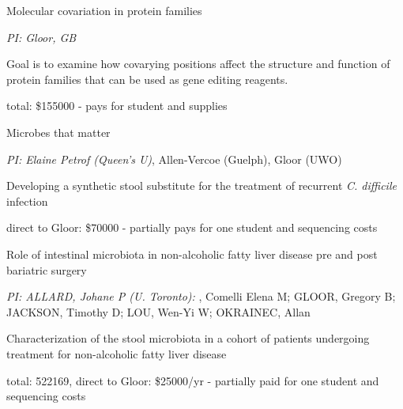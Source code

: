 \documentclass[11pt]{article}
\begin{document}
\begin{description}
\setlength\itemsep{0em}

\item[NSERC Discovery, 2015-2020:] Molecular covariation in protein families

\setlength\itemindent{-1em}

\item {\em PI: Gloor, GB}
\item Goal is to examine how  covarying positions affect the structure and function of protein families that can be used as gene editing reagents. 	
\item total: \$155000 - pays for student and supplies

\end{description}
\begin{description}
\setlength\itemsep{0em}

\item[NIH R21 Dec 2015-2017, NIH R33 2017-2018:] Microbes that matter

\setlength\itemindent{-1em}

\item {\em PI: Elaine Petrof (Queen's U)}, Allen-Vercoe (Guelph), Gloor (UWO)
\item Developing a synthetic stool substitute for the treatment of recurrent \emph{C. difficile} infection	
\item direct to Gloor: \$70000 - partially pays for one student and sequencing costs

\end{description}
\begin{description}
\setlength\itemsep{0em}

\item[CIHR 2013-2016:] Role of intestinal microbiota in non-alcoholic fatty liver disease pre and post bariatric surgery

\setlength\itemindent{-1em}

\item {\em PI: ALLARD, Johane P (U. Toronto): }, Comelli Elena M; GLOOR, Gregory B; JACKSON, Timothy D; LOU, Wen-Yi W; OKRAINEC, Allan
\item Characterization of the stool microbiota in a cohort of patients undergoing treatment for non-alcoholic fatty liver disease	
\item total: 522169, direct to Gloor: \$25000/yr - partially paid for one student and sequencing costs
\end{description}
\end{document}

